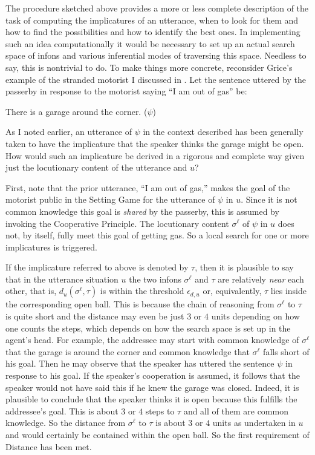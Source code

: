 The procedure sketched above provides a more or less complete description of the task of computing the implicatures of an utterance, when to look for them and how to find the possibilities and how to identify the best ones. In implementing such an idea computationally it would be necessary to set up an actual search space of infons and various inferential modes of traversing this space. Needless to say, this is nontrivial to do. To make things more concrete, reconsider Grice's example of the stranded motorist I discussed in . Let the sentence uttered by the passerby in response to the motorist saying ``I am out of gas'' be:

\begin{exe}
\ex There is a garage around the corner. ($\psi$)
\end{exe}

\noindent As I noted earlier, an utterance of $\psi$ in the context described has been generally taken to have the implicature that the speaker thinks the garage might be open. How would such an implicature be derived in a rigorous and complete way given just the locutionary content of the utterance and $u$?

First, note that the prior utterance, ``I am out of gas,'' makes the goal of the motorist public in the Setting Game for the utterance of $\psi$ in $u$. Since it is not common knowledge this goal is \emph{shared} by the passerby, this is assumed by invoking the Cooperative Principle. The locutionary content $\sigma^\ell$ of $\psi$ in $u$ does not, by itself, fully meet this goal of getting gas. So a local search for one or more implicatures is triggered.

If the implicature referred to above is denoted by $\tau$, then it is plausible to say that in the utterance situation $u$ the two infons $\sigma^\ell$ and $\tau$ are relatively \emph{near} each other, that is, $d_u(\sigma^\ell, \tau)$ is within the threshold $\epsilon_{d,u}$ or, equivalently, $\tau$ lies inside the corresponding open ball. This is because the chain of reasoning from $\sigma^\ell$ to $\tau$ is quite short and the distance may even be just $3$ or $4$ units depending on how one counts the steps, which depends on how the search space is set up in the agent's head. For example, the addressee may start with common knowledge of $\sigma^\ell$ that the garage is around the corner and common knowledge that $\sigma^\ell$ falls short of his goal. Then he may observe that the speaker has uttered the sentence $\psi$ in response to his goal. If the speaker's cooperation is assumed, it follows that the speaker would not have said this if he knew the garage was closed. Indeed, it is plausible to conclude that the speaker thinks it is open because this fulfills the addressee's goal. This is about $3$ or $4$ steps to $\tau$ and all of them are common knowledge. So the distance from $\sigma^{\ell}$ to $\tau$ is about $3$ or $4$ units as undertaken in $u$ and would certainly be contained within the open ball. So the first requirement of Distance has been met. 

